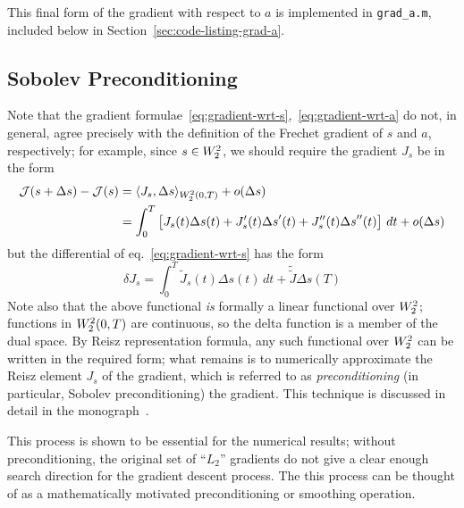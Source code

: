 \documentclass[letterpaper, 10pt, draft]{amsart}
\theoremstyle{definition}
\theoremstyle{remark}
\begin{document}
This final form of the gradient with respect to $a$ is implemented in
\verb+grad_a.m+, included below in Section~\ref{sec:code-listing-grad-a}.

\subsection{Sobolev Preconditioning}
Note that the gradient
formulae~\eqref{eq:gradient-wrt-s},~\eqref{eq:gradient-wrt-a} do not, in
general, agree precisely with the definition of the Frechet gradient of $s$ and
$a$, respectively; for example, since $s \in W_2^2$, we should require
the gradient $J_s$ be in the form
\begin{align*}
  \mathcal{J}(s+{\Delta s}) - \mathcal{J}(s)
  & = \langle J_s, {\Delta s} \rangle_{W_2^2(0,T)}
  + o({\Delta s})
  \\
  & = \int_0^T \left[
    J_s(t) {\Delta s}(t)
    + J_s'(t) {\Delta s}'(t)
    + J_s''(t) {\Delta s}''(t)
    \right]\,dt
    + o({\Delta s})
\end{align*}
but the differential of eq.~\eqref{eq:gradient-wrt-s} has the form
\[
  {\delta J}_s = \int_0^T \tilde{J}_s(t) {\Delta s}(t) \,dt + \tilde{\tilde{J}} {\Delta s}(T)
\]
Note also that the above functional \emph{is} formally a linear functional over
$W_2^2{}$; functions in $W_2^2(0,T)$ are continuous, so the
delta function is a member of the dual space.
By Reisz representation formula, any such functional over $W_2^2$ can
be written in the required form; what remains is to numerically approximate the
Reisz element $J_s$ of the gradient, which is referred to as \emph{preconditioning}
(in particular, Sobolev preconditioning) the gradient.
This technique is discussed in detail in the monograph~\cite{neuberger10}.

This process is shown to be essential for the numerical results; without
preconditioning, the original set of ``$L_2$'' gradients do not give a clear
enough search direction for the gradient descent process.
The this process can be thought of as a mathematically motivated preconditioning
or smoothing operation.
\end{document}
